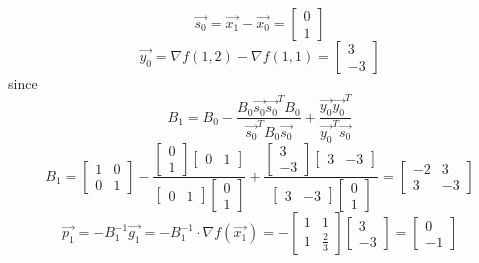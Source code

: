 \documentclass[a4paper,10pt]{article}
\begin{document}
\begin{enumerate}
\begin{enumerate}
{\color{blue} 
$$\vec{s_0}=\vec{x_1}-\vec{x_0}=
\begin{bmatrix}
0\\1
\end{bmatrix}$$
$$\vec{y_0}=\nabla f(1,2)-\nabla f(1,1)=
\begin{bmatrix}
3\\-3
\end{bmatrix}$$
since $$B_1=B_0-\frac{B_0\vec{s_0}\vec{s_0}^TB_0}{\vec{s_0}^TB_0\vec{s_0}}+\frac{\vec{y_0}\vec{y_0}^T}{\vec{y_0}^T\vec{s_0}}$$
$$B_1=
\begin{bmatrix}
1&0\\0&1
\end{bmatrix}
-\frac{\begin{bmatrix}
0\\1
\end{bmatrix}
\begin{bmatrix}
0&1
\end{bmatrix}}
{\begin{bmatrix}
0&1
\end{bmatrix}
\begin{bmatrix}
0\\1
\end{bmatrix}}+\frac{\begin{bmatrix}
3\\-3
\end{bmatrix}
\begin{bmatrix}
3&-3
\end{bmatrix}}
{\begin{bmatrix}
3&-3
\end{bmatrix}
\begin{bmatrix}
0\\1
\end{bmatrix}}=
\begin{bmatrix}
-2&3\\3&-3
\end{bmatrix}$$
$$\vec{p_1}=-B_1^{-1}\vec{g_1}=-B_1^{-1}\cdot\nabla f(\vec{x_1})=-\begin{bmatrix}
1&1\\1&\frac{2}{3}
\end{bmatrix}
\begin{bmatrix}
3\\-3
\end{bmatrix}=
\begin{bmatrix}
0\\-1
\end{bmatrix}$$

}

    \end{enumerate}


\end{enumerate}
\end{document}
